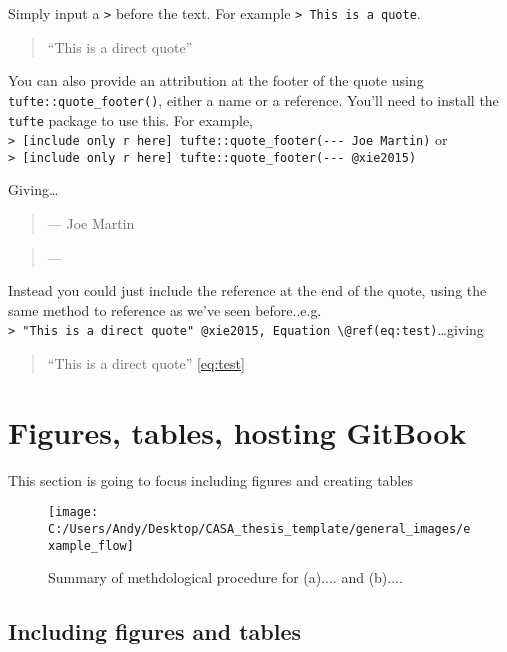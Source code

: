 \documentclass[
  12pt,
  oneside]{book}
\begin{document}
Simply input a \texttt{\textgreater{}} before the text. For example \texttt{\textgreater{}\ This\ is\ a\ quote}.

\begin{quote}
``This is a direct quote''
\end{quote}

You can also provide an attribution at the footer of the quote using \texttt{tufte::quote\_footer()}, either a name or a reference. You'll need to install the \texttt{tufte} package to use this. For example, \texttt{\textgreater{}\ {[}include\ only\ r\ here{]}\ tufte::quote\_footer(\textquotesingle{}-\/-\/-\ Joe\ Martin\textquotesingle{})} or \texttt{\textgreater{}\ {[}include\ only\ r\ here{]}\ tufte::quote\_footer(\textquotesingle{}-\/-\/-\ @xie2015\textquotesingle{})}

Giving\ldots{}

\begin{quote}
\hfill --- Joe Martin
\end{quote}

\begin{quote}
\hfill --- \textcite{xie2015}
\end{quote}

Instead you could just include the reference at the end of the quote, using the same method to reference as we've seen before..e.g. \texttt{\textgreater{}\ "This\ is\ a\ direct\ quote"\ @xie2015,\ Equation\ \textbackslash{}@ref(eq:test)}\ldots giving

\begin{quote}
``This is a direct quote'' \textcite{xie2015} \eqref{eq:test}
\end{quote}

\hypertarget{figures-tables-hosting-gitbook}{%
\chapter{Figures, tables, hosting GitBook}\label{figures-tables-hosting-gitbook}}

This section is going to focus including figures and creating tables

\begin{figure}
\texttt{[image: C:/Users/Andy/Desktop/CASA\_thesis\_template/general\_images/example\_flow]} \caption{Summary of methdological procedure for (a).... and (b)....}\label{fig:methodsflow}
\end{figure}

\hypertarget{including-figures-and-tables}{%
\section{Including figures and tables}\label{including-figures-and-tables}}
\end{document}

